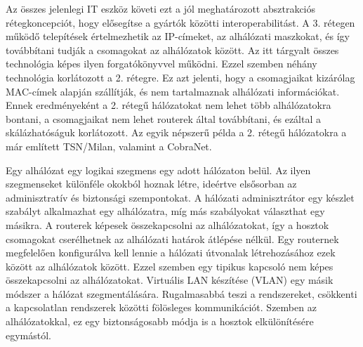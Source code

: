 Az összes jelenlegi IT eszköz követi ezt a jól
meghatározott absztrakciós rétegkoncepciót, hogy elősegítse a gyártók közötti
interoperabilitást. A 3. rétegen működő telepítések értelmezhetik az IP-címeket,
az alhálózati maszkokat, és így továbbítani tudják a csomagokat az
alhálózatok között. Az itt tárgyalt összes technológia képes ilyen
forgatókönyvvel működni. Ezzel szemben néhány technológia korlátozott a 2.
rétegre. Ez azt jelenti, hogy a csomagjaikat kizárólag MAC-címek alapján
szállítják, és nem tartalmaznak alhálózati információkat. Ennek eredményeként a
2. rétegű hálózatokat nem lehet több alhálózatokra bontani, a csomagjaikat nem
lehet routerek által továbbítani, és ezáltal a skálázhatóságuk korlátozott. 
Az egyik népszerű példa a 2. rétegű hálózatokra a már említett TSN/Milan, valamint a CobraNet.

Egy alhálózat egy logikai szegmens egy adott hálózaton belül. Az ilyen szegmenseket
különféle okokból hoznak létre, ideértve elsősorban az adminisztratív és biztonsági
szempontokat. A hálózati adminisztrátor egy készlet szabályt alkalmazhat egy
alhálózatra, míg más szabályokat választhat egy másikra. A routerek képesek
összekapcsolni az alhálózatokat, így a hosztok csomagokat cserélhetnek az
alhálózati határok átlépése nélkül. Egy routernek megfelelően konfigurálva kell
lennie a hálózati útvonalak létrehozásához ezek között az alhálózatok között.
Ezzel szemben egy tipikus kapcsoló nem képes összekapcsolni az alhálózatokat.
Virtuális LAN készítése (VLAN) egy másik módszer a hálózat szegmentálására. 
Rugalmasabbá teszi a rendszereket, csökkenti a kapcsolatlan rendszerek közötti fölösleges kommunikációt.
Szemben az alhálózatokkal, ez egy biztonságosabb módja is a hosztok elkülönítésére egymástól.
